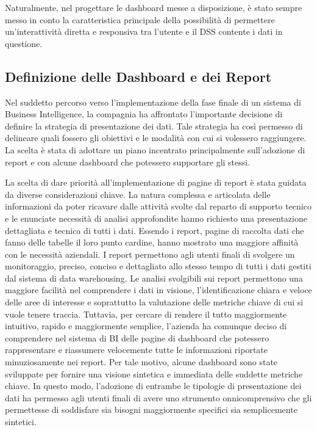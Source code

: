 Naturalmente, nel progettare le dashboard messe a disposizione, è stato sempre messo in conto la caratteristica principale della possibilità di permettere un'interattività diretta e responsiva tra l'utente e il DSS contente i dati in questione.

\subsection{Definizione delle Dashboard e dei Report}
Nel suddetto percorso verso l'implementazione della fase finale di un sistema di Business Intelligence, la compagnia ha affrontato l'importante decisione di definire la strategia di presentazione dei dati. Tale strategia ha così permesso di delineare quali fossero gli obiettivi e le modalità con cui si volessero raggiungere. La scelta è stata di adottare un piano incentrato principalmente sull'adozione di report e con alcune dashboard che potessero supportare gli stessi.

La scelta di dare priorità all'implementazione di pagine di report è stata guidata da diverse considerazioni chiave. La natura complessa e articolata delle informazioni da poter ricavare dalle attività svolte dal reparto di supporto tecnico e le enunciate necessità di analisi approfondite hanno richiesto una presentazione dettagliata e tecnica di tutti i dati. Essendo i report, pagine di raccolta dati che fanno delle tabelle il loro punto cardine, hanno mostrato una maggiore affinità con le necessità aziendali. I report permettono agli utenti finali di svolgere un monitoraggio, preciso, conciso e dettagliato allo stesso tempo di tutti i dati gestiti dal sistema di data warehousing. Le analisi svolgibili sui report permettono una maggiore facilità nel comprendere i dati in visione, l'identificazione chiara e veloce delle aree di interesse e soprattutto la valutazione delle metriche chiave di cui si vuole tenere traccia. Tuttavia, per cercare di rendere il tutto maggiormente intuitivo, rapido e maggiormente semplice, l'azienda ha comunque deciso di comprendere nel sistema di BI delle pagine di dashboard che potessero rappresentare e riassumere velocemente tutte le informazioni riportate minuziosamente nei report. Per tale motivo, alcune dashboard sono state sviluppate per fornire una visione sintetica e immediata delle suddette metriche chiave. In questo modo, l'adozione di entrambe le tipologie di presentazione dei dati ha permesso agli utenti finali di avere uno strumento onnicomprensivo che gli permettesse di soddisfare sia bisogni maggiormente specifici sia semplicemente sintetici.

